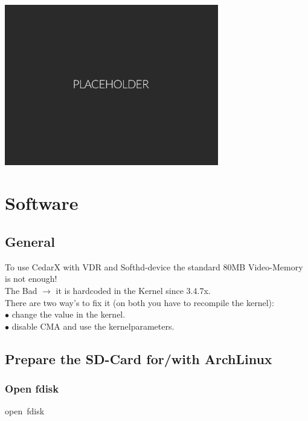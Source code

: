 \documentclass[11pt, a4paper,ngerman]{article}
\begin{document}
\vspace{0.4cm}
\begin{center}
\includegraphics[width=0.7\textwidth]{pictures/placeholder.png}
\end{center}

\newpage
\section{Software}
\subsection{General}

To use CedarX with VDR and Softhd-device the standard 80MB Video-Memory is not enough!\\

The Bad $\rightarrow$ it is hardcoded in the Kernel since 3.4.7x.\\

There are two way's to fix it (on both you have to recompile the kernel):\\

$\bullet$ change the value in the kernel. \\
$\bullet$ disable CMA and use the kernelparameters.

\subsection{Prepare the SD-Card for/with ArchLinux}
\subsubsection{Open fdisk}

\begin{mintedbox}[breakable=true,
 bottomrule=0.5mm,
 width=\paperwidth-3cm,
 boxsep=1mm, 
 enhanced=true,
 colframe = monoblack,
 drop fuzzy shadow,
 colback = black
 ]{open\ fdisk}%
 

     \inputminted[firstline=8,lastline=8, 
     linenos=true, framesep=2mm, mathescape, numbersep=5pt,tabsize=4,%
]{bash}{includes/archlinux.sh}%

\end{mintedbox}%
\vspace{-0.4cm}
\end{document}
